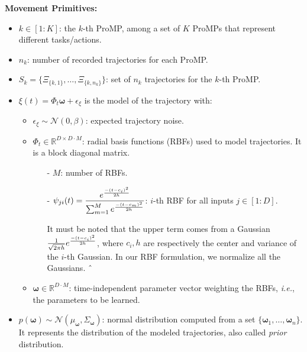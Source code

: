 \documentclass[utf8]{frontiersSCNS} %
\newcommand{\rev}[1]{\textcolor{blue}{#1}}
\newcommand{\todo}[1]{\textcolor{red}{\textbf{/*#1*/}}}
\begin{document}
\textbf{Movement Primitives:}
\begin{itemize}
\item $k \in [1:K]$: the $k$-th ProMP, among a set of $K$ ProMPs that represent different tasks/actions. 
\item $n_k$: number of recorded trajectories for each ProMP.
\item $S_k = \{\Xi_{\{k,1\}},\ldots,\Xi_{\{k,n_k\}}\}$: set of $n_k$ trajectories for the $k$-th ProMP. 
\end{itemize}
\begin{itemize}
\item $\xi(t) = \Phi_t \boldsymbol{\omega} + \epsilon_\xi$ is the model of the trajectory with:
\begin{itemize}
\item $\epsilon_\xi \sim \mathcal{N}(0, \beta)$: expected trajectory noise.
\item $\Phi_t \in \mathbb{R}^{D\times D \cdot M}$: radial basis functions (RBFs) used to model trajectories. It is a block diagonal matrix.
\begin{itemize}
\item[-] $M$: number of RBFs.
\item[-] $ \psi_{ji}(t) =\dfrac{e^{-(t - c_i)^2 \over 2h}}{\sum_{m=1}^{M} e^{-(t - c_m)^2 \over 2h} }$: $i$-th RBF for all inputs $j \in [1:D]$. 

It must be noted that the upper term comes from a Gaussian $\frac{1}{\sqrt{2\pi h}} e^{-(t - c_i)^2 \over 2h}$, where $ c_i, h$ are respectively the center and variance of the $i$-th Gaussian. In our RBF formulation, we normalize all the Gaussians.
ˆ%
\end{itemize}
\item $\boldsymbol{\omega} \in \mathbb{R}^{D \cdot M}$: time-independent parameter vector weighting the RBFs, \textit{i.e.}, the parameters to be learned.

\end{itemize}

\item $p(\boldsymbol{\omega}) \sim \mathcal{N}(\mu_{\boldsymbol{\omega}}, \Sigma_{\boldsymbol{\omega}})$: normal distribution computed from a set $\{\boldsymbol{\omega}_1, \ldots, \boldsymbol{\omega}_n\}$. It represents the distribution of the modeled trajectories, also called \textit{prior} distribution.



\end{itemize}
\end{document}
